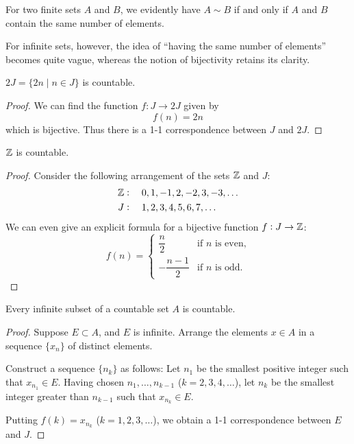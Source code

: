 For two finite sets $A$ and $B$, we evidently have $A\sim B$ if and only if $A$ and $B$ contain the same number of elements.

For infinite sets, however, the idea of ``having the same number of elements'' becomes quite vague, whereas the notion of bijectivity retains its clarity.

\begin{proposition}
$2J=\{2n\mid n\in J\}$ is countable.
\end{proposition}

\begin{proof}
We can find the function $f:J\to2J$ given by 
\[f(n)=2n\]
which is bijective. Thus there is a 1-1 correspondence between $J$ and $2J$.
\end{proof}

\begin{proposition}
$\mathbb Z$ is countable.
\end{proposition}

\begin{proof}
Consider the following arrangement of the sets $\mathbb Z$ and $J$:
\begin{align*}
\mathbb Z&:\quad0,1,-1,2,-2,3,-3,\dots\\
J&:\quad1,2,3,4,5,6,7,\dots
\end{align*}
We can even give an explicit formula for a bijective function $f:J\to\mathbb Z$:
\[f(n)=\begin{cases}
\dfrac{n}{2}&\text{if }n\text{ is even,}\\[1ex]
-\dfrac{n-1}{2}&\text{if }n\text{ is odd.}
\end{cases}\]
\end{proof}

\begin{proposition}
Every infinite subset of a countable set $A$ is countable.
\end{proposition}

\begin{proof}
Suppose $E\subset A$, and $E$ is infinite. Arrange the elements $x\in A$ in a sequence $\{x_n\}$ of distinct elements.

Construct a sequence $\{n_k\}$ as follows: Let $n_1$ be the smallest positive integer such that $x_{n_1}\in E$. Having chosen $n_1,\dots,n_{k-1}$ ($k=2,3,4,\dots$), let $n_k$ be the smallest integer greater than $n_{k-1}$ such that $x_{n_k}\in E$.

Putting $f(k)=x_{n_k}$ ($k=1,2,3,\dots$), we obtain a 1-1 correspondence between $E$ and $J$.
\end{proof}

